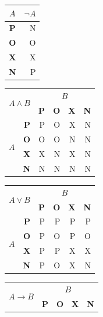 \documentclass[a4paper, titlepage, 11pt]{article}
\begin{document}
\bigskip
\begin{table}[h]
  \centering
  \begin{tabular}[p]{|c|r|}
  \hline
  $A$         &     $\neg A$\\
  \hline
  \textbf{P}    & N\\
  \hline
  \textbf{O}    & O\\
  \hline
  \textbf{X}    & X\\
  \hline
  \textbf{N}    & P\\
  \hline
  \end{tabular}
  \begin{tabular}[p]{|c|r|r|r|r|r|}
    \hline
    \multicolumn{2}{|c|}{\multirow{2}{*}{$A \wedge B$}} & \multicolumn{4}{c|}{$B$}\\
    \cline{3-6}
    \multicolumn{2}{|c|}{} & \textbf{P} & \textbf{O} & \textbf{X} & \textbf{N}\\
    \hline
    \multirow{4}{*}{$A$} & \textbf{P} & P & O & X & N\\
    \cline{2-6}
                & \textbf{O} & O & O & N & N\\
    \cline{2-6}
                & \textbf{X} & X & N & X & N\\
    \cline{2-6}
                & \textbf{N} & N & N & N & N\\
    \hline
  \end{tabular}
  \begin{tabular}[p]{|c|r|r|r|r|r|}
    \hline
    \multicolumn{2}{|c|}{\multirow{2}{*}{$A \vee B$}} & \multicolumn{4}{c|}{$B$}\\
    \cline{3-6}
    \multicolumn{2}{|c|}{} & \textbf{P} & \textbf{O} & \textbf{X} & \textbf{N}\\
    \hline
    \multirow{4}{*}{$A$} & \textbf{P} & P & P & P & P\\
    \cline{2-6}
                & \textbf{O} & P & O & P & O\\
    \cline{2-6}
                & \textbf{X} & P & P & X & X\\
    \cline{2-6}
                & \textbf{N} & P & O & X & N\\
    \hline
  \end{tabular}
  \begin{tabular}[p]{|c|r|r|r|r|r|}
    \hline
    \multicolumn{2}{|c|}{\multirow{2}{*}{$A \rightarrow B$}} &   \multicolumn{4}{c|}{$B$} \\
    \cline{3-6}
    \multicolumn{2}{|c|}{}                              & \textbf{P}                  & \textbf{O}       & \textbf{X}       & \textbf{N}\\

\end{tabular}
\end{table}
\end{document}
